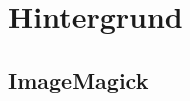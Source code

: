\chapter{Hintergrund}\label{ch:hintergrund}





\newpage
\section{ImageMagick}\label{sec:imagemagick2}


